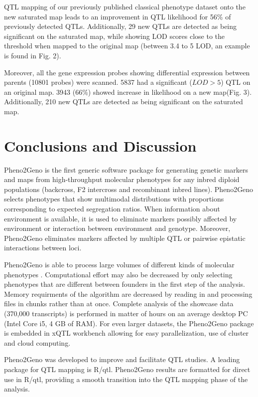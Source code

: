 QTL mapping of our previously published classical phenotype dataset \cite{Joosen:2011} onto the 
new saturated map leads to an improvement in QTL likelihood for 56\% of previously detected QTLs. 
Additionally, 29 new QTLs are detected as being significant on the saturated map, while showing 
LOD scores close to the threshold when mapped to the original map (between 3.4 to 5 LOD, an 
example is found in Fig. 2).

Moreover, all the gene expression probes showing differential expression between parents (10801 
probes) were scanned. 5837 had a significant ($LOD > 5$) QTL on an original map. 3943 (66\%) 
showed increase in likelihood on a new map(Fig. 3). Additionally, 210 new QTLs are detected as 
being significant on the saturated map.
  
\section{Conclusions and Discussion}
Pheno2Geno is the first generic software package for generating genetic markers and maps from 
high-throughput molecular phenotypes for any inbred diploid populations (backcross, F2 intercross 
and recombinant inbred lines). Pheno2Geno selects phenotypes that show multimodal distributions 
with proportions corresponding to expected segregation ratios. When information about environment 
is available, it is used to eliminate markers possibly affected by environment or interaction 
between environment and genotype. Moreover, Pheno2Geno eliminates markers affected by multiple 
QTL or pairwise epistatic interactions between loci.

Pheno2Geno is able to process large volumes of different kinds of molecular phenotypes 
\cite{Trelles:2011}. Computational effort may also be decreased by only selecting phenotypes 
that are different between founders in the first step of the analysis. Memory requirments of the 
algorithm are decreased by reading in and processing files in chunks rather than at once. 
Complete analysis of the showcase data (370,000 transcripts) is performed in matter of hours 
on an average desktop PC (Intel Core i5, 4 GB of RAM). For even larger datasets, the Pheno2Geno 
package is embedded in xQTL workbench \cite{Arends:2012, Snoek:2012} allowing for easy 
parallelization, use of cluster and cloud computing.\newline

Pheno2Geno was developed to improve and facilitate QTL studies. A leading package for QTL mapping 
is R/qtl. Pheno2Geno results are formatted for direct use in R/qtl, providing a smooth transition 
into the QTL mapping phase of the analysis. \newline


